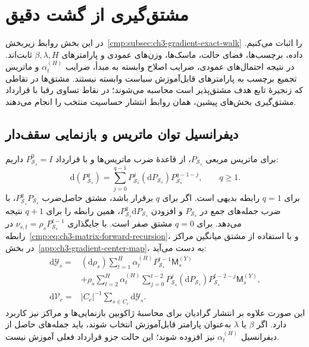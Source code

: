 \section{مشتق‌گیری از گشت دقیق}
\label{app:ch3-gradient-walk}

در این بخش روابط
زیربخش~\ref{cmp:subsec:ch3-gradient-exact-walk}
را اثبات می‌کنیم. داده، برچسب‌ها، فضای حالت،
ماسک‌ها، وزن‌های عمودی و پارامترهای
$\beta,\lambda,H$ ثابت‌اند. در نتیجه احتمال‌های
عمودی، ضرایب اصلاح وابسته به مبدأ،
ضرایب $\alpha_t^{(H)}$ و ماتریس تجمیع برچسب
به پارامترهای قابل‌آموزش سیاست وابسته نیستند.
مشتق‌ها در نقاطی که زنجیرهٔ تابع هدف مشتق‌پذیر
است محاسبه می‌شوند؛ در نقاط تساوی رقبا با
قرارداد مشتق‌گیری بخش‌های پیشین، همان روابط
انتشار حساسیت منتخب را انجام می‌دهند.

\subsection{دیفرانسیل توان ماتریس و بازنمایی سقف‌دار}
\label{app:ch3-gradient-walk-differential}

برای ماتریس مربعی $P_{\mathcal S_s}$،
از قاعدهٔ ضرب ماتریس‌ها و با قرارداد
$P_{\mathcal S_s}^0=I$ داریم:
\begin{equation}\label{eq:app-ch3-power-differential}
\mathrm d(P_{\mathcal S_s}^q)
=\sum_{j=0}^{q-1}P_{\mathcal S_s}^j
(\mathrm dP_{\mathcal S_s})P_{\mathcal S_s}^{q-1-j},
\qquad q\ge1.
\end{equation}
برای $q=1$ رابطه بدیهی است. اگر برای $q$
برقرار باشد، مشتق حاصل‌ضرب
$P_{\mathcal S_s}^qP_{\mathcal S_s}$،
با ضرب جمله‌های جمع در $P_{\mathcal S_s}$
و افزودن $P_{\mathcal S_s}^q\mathrm dP_{\mathcal S_s}$،
همین رابطه را برای $q+1$ نتیجه می‌دهد.
برای $q=0$ مشتق صفر است.
با جایگذاری
$\nu_{s,t}=\rho_sP_{\mathcal S_s}^{t-1}$
در رابطه~\eqref{cmp:eq:ch3-matrix-forward-recursion}،
و با استفاده از مشتق میانگین مراکز در
بخش~\ref{app:ch3-gradient-center-map}، به دست می‌آید:
\begin{equation}\label{eq:app-ch3-center-differential}
\begin{aligned}
\mathrm d\mathscr Y_s
={}&(\mathrm d\rho_s)
\sum_{t=1}^{H}\alpha_t^{(H)}
P_{\mathcal S_s}^{t-1}\mathsf M_s^{(Y)}\\
&+\rho_s\sum_{t=2}^{H}\alpha_t^{(H)}
\sum_{j=0}^{t-2}P_{\mathcal S_s}^j
(\mathrm dP_{\mathcal S_s})
P_{\mathcal S_s}^{t-2-j}\mathsf M_s^{(Y)},\\
\mathrm d\mathcal V_c
={}&|C_c|^{-1}\sum_{s\in C_c}\mathrm d\mathscr Y_s.
\end{aligned}
\end{equation}
این صورت علاوه بر انتشار گرادیان برای محاسبهٔ
ژاکوبین بازنمایی‌ها و مراکز نیز کاربرد دارد.
اگر $\beta$ یا $\lambda$ به‌عنوان پارامتر
قابل‌آموزش انتخاب شوند، باید جمله‌های حاصل
از دیفرانسیل $\alpha_t^{(H)}$ نیز افزوده شوند؛
این حالت جزو قرارداد فعلی آموزش نیست.

